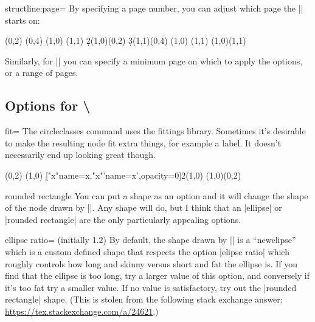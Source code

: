 \documentclass{ltxdoc}
\makeatletter
\def\sectionstring{\textbackslash\@xp\@gobble\string}
\makeatother
\begin{document}
\begin{sseqdata}[name=ex1,degree={#1}{1-#1}]
\begin{key}{structline:page=}
By specifying a page number, you can adjust which page the |\structline| starts on:

\begin{codeexample}[]
\begin{sseqdata}[name=structpage example2]
\class(0,2)
\class(0,4)
\class(1,0)
\class(1,1)
\d2(1,0)(0,2)
\d3(1,1)(0,4)
\replaceclass(1,0)
\replaceclass(1,1)
\structline[structline:page=2](1,0)(1,1)
\end{sseqdata}
\printpage[name=structpage example2,page=1]
\printpage[name=structpage example2,page=2]
\printpage[name=structpage example2,page=3]
\printpage[name=structpage example2,page=4]
\end{codeexample}

Similarly, for |\structlineoptions| you can specify a minimum page on which to apply the options, or a range of pages.
\end{key}

\subsection{Options for \sectionstring\circleclass}
\begin{key}{fit=}
The circleclasses command uses the \tikzname\space fittings library. Sometimes it's desirable to make the resulting node fit extra things, for example a label. It doesn't necessarily end up looking great though.
\begin{codeexample}[]
\begin{sseqpage}[Adams grading,axes gap=0.7cm]
\class(0,2)
\class(1,0)
\d["x"{name=x},"x"'{name=x',opacity=0}]2(1,0)
\circleclasses[fit=(x)(x'),rounded rectangle](1,0)(0,2)
\end{sseqpage}
\end{codeexample}
\end{key}

\begin{key}{rounded rectangle}
You can put a shape as an option and it will change the shape of the node drawn by |\circleclasses|. Any shape will do, but I think that an |ellipse| or |rounded rectangle| are the only particularly appealing options.
\end{key}

\begin{key}{ellipse ratio= (initially 1.2)}
By default, the shape drawn by |\circleclasses| is a ``newelipse'' which is a custom defined shape that respects the option |elipse ratio| which roughly controls how long and skinny versus short and fat the ellipse is. If you find that the ellipse is too long, try a larger value of this option, and conversely if it's too fat try a smaller value. If no value is satisfactory, try out the |rounded rectangle| shape. (This is stolen from the following stack exchange answer: \url{https://tex.stackexchange.com/a/24621}.)
\end{key}



\end{sseqdata}
\end{document}
